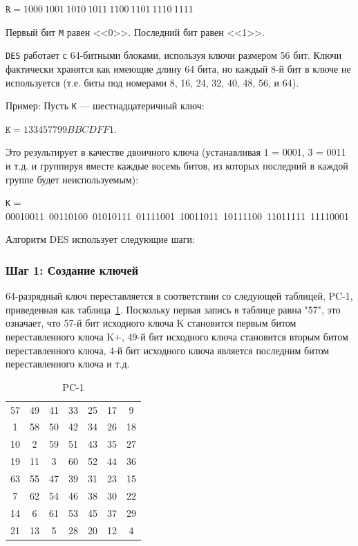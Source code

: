 $\texttt{R} = 1000\ 1001\ 1010\ 1011\ 1100\ 1101\ 1110\ 1111$

Первый бит \texttt{M} равен <<0>>. Последний бит равен <<1>>.

\texttt{DES} работает с 64-битными блоками, используя ключи размером 56 бит. 
Ключи фактически хранятся как имеющие длину 64 бита, но каждый 8-й бит в ключе не используется (т.е. биты под номерами 8, 16, 24, 32, 40, 48, 56, и 64). 

Пример: Пусть \texttt{K} --- шестнадцатеричный ключ:

$\texttt{K} = 133457799BBCDFF1$.

Это результирует в качестве двоичного ключа (устанавливая 1 = 0001, 3 = 0011 и т.д. и группируя вместе каждые восемь битов, из которых последний в каждой группе будет неиспользуемым):

\texttt{K} = 00010011\ 00110100\ 01010111\ 01111001\ 10011011\ 10111100\ 11011111\ 11110001

Алгоритм DES использует следующие шаги:

\subsubsection{Шаг 1: Создание ключей}

64-разрядный ключ переставляется в соответствии со следующей таблицей, PC-1, приведенная как таблица~\ref{tbl:pc-1}. 
Поскольку первая запись в таблице равна "57", это означает, что 57-й бит исходного ключа K становится первым битом переставленного ключа K+,
49-й бит исходного ключа становится вторым битом переставленного ключа,
4-й бит исходного ключа является последним битом переставленного ключа и т.д.

\begin{table}[ht!]
    \begin{center}
		\captionsetup{justification=raggedright,singlelinecheck=off}
		\caption{\label{tbl:pc-1} PC-1}
        \begin{tabular}{ |c c c c c c c|}
                57 &   49  &  41  & 33   & 25  &  17  &  9 \\
                       1  & 58  &  50 &  42 &   34 &   26 &  18 \\
                      10 &   2 &   59 &  51 &   43 &   35 &  27 \\
                      19 &  11 &    3 &  60  &  52  &  44   & 36 \\
                      63  & 55 &   47  & 39  &  31  &  23  & 15 \\
                       7  & 62  &  54  & 46  &  38  &  30  & 22 \\
                      14  &  6  &  61  & 53  &  45  &  37  & 29 \\
                      21  & 13   &  5  & 28  &  20  &  12  &  4
        \end{tabular}
    \end{center}
\end{table}

